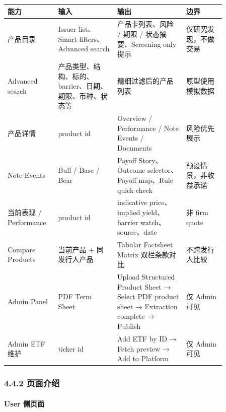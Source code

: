 \begingroup
\small
\begin{longtable}{L{0.18\linewidth}L{0.24\linewidth}L{0.28\linewidth}L{0.16\linewidth}}
\toprule
\textbf{能力} & \textbf{输入} & \textbf{输出} & \textbf{边界} \\
\midrule
产品目录 & Issuer list、Smart filters、Advanced search & 产品卡列表、风险 / 期限 / 状态摘要、Screening only 提示 & 仅研究发现，不做交易 \\
Advanced search & 产品类型、结构、标的、barrier、日期、期限、币种、状态等 & 精细过滤后的产品列表 & 原型使用模拟数据 \\
产品详情 & product id & Overview / Performance / Note Events / Documents & 风险优先展示 \\
Note Events & Bull / Base / Bear & Payoff Story、Outcome selector、Payoff map、Rule quick check & 预设情景，非收益承诺 \\
当前表现 / Performance & product id & indicative price、implied yield、barrier watch、source、date & 非 firm quote \\
Compare Products & 当前产品 + 同发行人产品 & Tabular Factsheet Matrix 双栏条款对比 & 不跨发行人比较 \\
Admin Panel & PDF Term Sheet & Upload Structured Product Sheet → Select PDF product sheet → Extraction complete → Publish & 仅 Admin 可见 \\
Admin ETF 维护 & ticker id & Add ETF by ID → Fetch preview → Add to Platform & 仅 Admin 可见 \\
\bottomrule
\end{longtable}
\endgroup

\subsubsection{4.4.2 页面介绍}

\paragraph{User 侧页面}






